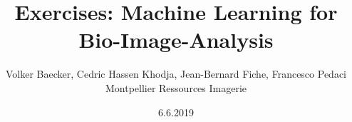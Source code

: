 \documentclass{book}
\begin{document}
\title{Exercises: Machine Learning for Bio-Image-Analysis}
\author{Volker Baecker, Cedric Hassen Khodja, Jean-Bernard Fiche, Francesco Pedaci\\Montpellier Ressources Imagerie}
\date{6.6.2019}
\maketitle
\tableofcontents
\listoffigures




\end{document}
